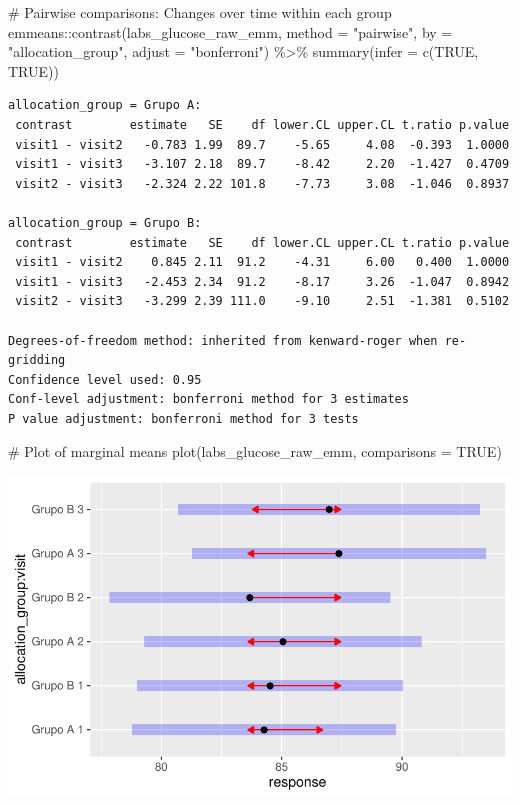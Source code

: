 \documentclass[
  12pt,
]{article}
\newenvironment{Shaded}{\begin{snugshade}}{\end{snugshade}}
\newcommand{\AttributeTok}[1]{\textcolor[rgb]{0.40,0.45,0.13}{#1}}
\newcommand{\CommentTok}[1]{\textcolor[rgb]{0.37,0.37,0.37}{#1}}
\newcommand{\ConstantTok}[1]{\textcolor[rgb]{0.56,0.35,0.01}{#1}}
\newcommand{\FunctionTok}[1]{\textcolor[rgb]{0.28,0.35,0.67}{#1}}
\newcommand{\NormalTok}[1]{\textcolor[rgb]{0.00,0.23,0.31}{#1}}
\newcommand{\SpecialCharTok}[1]{\textcolor[rgb]{0.37,0.37,0.37}{#1}}
\newcommand{\StringTok}[1]{\textcolor[rgb]{0.13,0.47,0.30}{#1}}
\begin{document}
\begin{Shaded}
\begin{Highlighting}[]
\CommentTok{\# Pairwise comparisons: Changes over time within each group}
\NormalTok{emmeans}\SpecialCharTok{::}\FunctionTok{contrast}\NormalTok{(labs\_glucose\_raw\_emm,}
\AttributeTok{method =} \StringTok{"pairwise"}\NormalTok{, }\AttributeTok{by =} \StringTok{"allocation\_group"}\NormalTok{,}
\AttributeTok{adjust =} \StringTok{"bonferroni"}\NormalTok{) }\SpecialCharTok{\%\textgreater{}\%} \FunctionTok{summary}\NormalTok{(}\AttributeTok{infer =} \FunctionTok{c}\NormalTok{(}\ConstantTok{TRUE}\NormalTok{, }\ConstantTok{TRUE}\NormalTok{))}
\end{Highlighting}
\end{Shaded}

\begin{verbatim}
allocation_group = Grupo A:
 contrast        estimate   SE    df lower.CL upper.CL t.ratio p.value
 visit1 - visit2   -0.783 1.99  89.7    -5.65     4.08  -0.393  1.0000
 visit1 - visit3   -3.107 2.18  89.7    -8.42     2.20  -1.427  0.4709
 visit2 - visit3   -2.324 2.22 101.8    -7.73     3.08  -1.046  0.8937

allocation_group = Grupo B:
 contrast        estimate   SE    df lower.CL upper.CL t.ratio p.value
 visit1 - visit2    0.845 2.11  91.2    -4.31     6.00   0.400  1.0000
 visit1 - visit3   -2.453 2.34  91.2    -8.17     3.26  -1.047  0.8942
 visit2 - visit3   -3.299 2.39 111.0    -9.10     2.51  -1.381  0.5102

Degrees-of-freedom method: inherited from kenward-roger when re-gridding 
Confidence level used: 0.95 
Conf-level adjustment: bonferroni method for 3 estimates 
P value adjustment: bonferroni method for 3 tests 
\end{verbatim}

\begin{Shaded}
\begin{Highlighting}[]
\CommentTok{\# Plot of marginal means}
\FunctionTok{plot}\NormalTok{(labs\_glucose\_raw\_emm, }\AttributeTok{comparisons =} \ConstantTok{TRUE}\NormalTok{)}
\end{Highlighting}
\end{Shaded}

\includegraphics{Outcomes_files/figure-pdf/labs_glucose_raw_emm-1.pdf}
\end{document}
